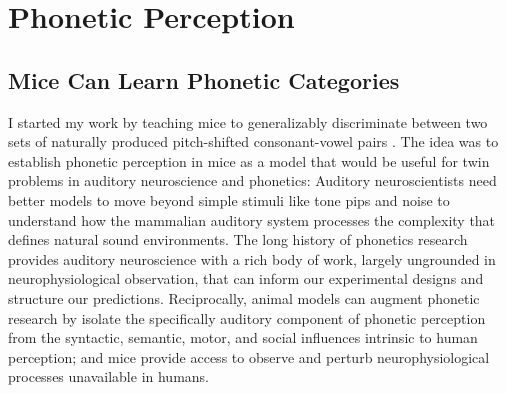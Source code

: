 \section{Phonetic Perception}
\label{sec:phonemes}

\subsection{Mice Can Learn Phonetic Categories}

I started my work by teaching mice to generalizably discriminate between two sets of naturally produced pitch-shifted consonant-vowel pairs \cite{saundersMiceCanLearn2019}. The idea was to establish phonetic perception in mice as a model that would be useful for twin problems in auditory neuroscience and phonetics: Auditory neuroscientists need better models to move beyond simple stimuli like tone pips and noise to understand how the mammalian auditory system processes the complexity that defines natural sound environments. The long history of phonetics research provides auditory neuroscience with a rich body of work, largely ungrounded in neurophysiological observation, that can inform our experimental designs and structure our predictions. Reciprocally, animal models can augment phonetic research by isolate the specifically auditory component of phonetic perception from the syntactic, semantic, motor, and social influences intrinsic to human perception; and mice provide access to observe and perturb neurophysiological processes unavailable in humans.

